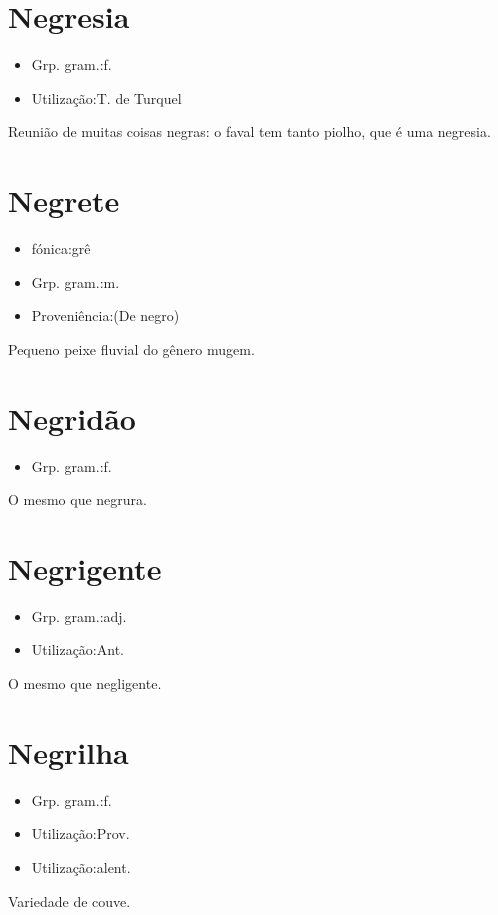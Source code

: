 \section{Negresia}
\begin{itemize}
\item {Grp. gram.:f.}
\end{itemize}
\begin{itemize}
\item {Utilização:T. de Turquel}
\end{itemize}
Reunião de muitas coisas negras: \textunderscore o faval tem tanto piolho, que é uma negresia\textunderscore .
\section{Negrete}
\begin{itemize}
\item {fónica:grê}
\end{itemize}
\begin{itemize}
\item {Grp. gram.:m.}
\end{itemize}
\begin{itemize}
\item {Proveniência:(De \textunderscore negro\textunderscore )}
\end{itemize}
Pequeno peixe fluvial do gênero mugem.
\section{Negridão}
\begin{itemize}
\item {Grp. gram.:f.}
\end{itemize}
O mesmo que \textunderscore negrura\textunderscore .
\section{Negrigente}
\begin{itemize}
\item {Grp. gram.:adj.}
\end{itemize}
\begin{itemize}
\item {Utilização:Ant.}
\end{itemize}
O mesmo que \textunderscore negligente\textunderscore .
\section{Negrilha}
\begin{itemize}
\item {Grp. gram.:f.}
\end{itemize}
\begin{itemize}
\item {Utilização:Prov.}
\end{itemize}
\begin{itemize}
\item {Utilização:alent.}
\end{itemize}
Variedade de couve.
